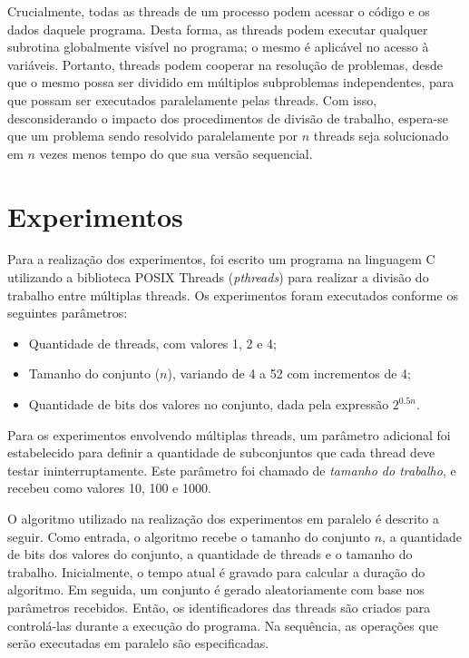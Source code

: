 \documentclass[12pt]{article}
\begin{document}
Crucialmente, todas as threads de um processo podem acessar o código e os dados daquele programa. Desta forma, as threads podem executar qualquer subrotina globalmente visível no programa; o mesmo é aplicável no acesso à variáveis. Portanto, threads podem cooperar na resolução de problemas, desde que o mesmo possa ser dividido em múltiplos subproblemas independentes, para que possam ser executados paralelamente pelas threads. Com isso, desconsiderando o impacto dos procedimentos de divisão de trabalho, espera-se que um problema sendo resolvido paralelamente por $n$ threads seja solucionado em $n$ vezes menos tempo do que sua versão sequencial.

\section{Experimentos} \label{sec:experiments}

Para a realização dos experimentos, foi escrito um programa  na linguagem C utilizando a biblioteca POSIX Threads (\textit{pthreads}) para realizar a divisão do trabalho entre múltiplas threads. Os experimentos foram executados conforme os seguintes parâmetros:

\begin{itemize}
    \item Quantidade de threads, com valores 1, 2 e 4;
    \item Tamanho do conjunto ($n$), variando de 4 a 52 com incrementos de 4;
    \item Quantidade de bits dos valores no conjunto, dada pela expressão $2^{0.5n}$.
\end{itemize}

Para os experimentos envolvendo múltiplas threads, um parâmetro adicional foi estabelecido para definir a quantidade de subconjuntos que cada thread deve testar ininterruptamente. Este parâmetro foi chamado de \textit{tamanho do trabalho}, e recebeu como valores 10, 100 e 1000.

O algoritmo utilizado na realização dos experimentos em paralelo é descrito a seguir. Como entrada, o algoritmo recebe o tamanho do conjunto $n$, a quantidade de bits dos valores do conjunto, a quantidade de threads e o tamanho do trabalho. Inicialmente, o tempo atual é gravado para calcular a duração do algoritmo. Em seguida, um conjunto é gerado aleatoriamente com base nos parâmetros recebidos. Então, os identificadores das threads são criados para controlá-las durante a execução do programa. Na sequência, as operações que serão executadas em paralelo são especificadas.
\end{document}
